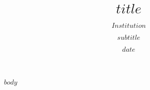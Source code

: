 \documentclass[xcolor=dvipsnames,a4paper,t]{beamer}
\title{$title$}
\subtitle{$Institution$}
\author{$subtitle$}
\institute{$Author$}
\date{$date$}
\begin{document}
\begin{frame}[plain]
  \titlepage
\end{frame}



\belowdisplayskip=0pt
\setlength{\abovedisplayskip}{0pt}
\setlength{\belowdisplayskip}{0pt}
\setlength{\abovedisplayshortskip}{0pt}
\setlength{\belowdisplayshortskip}{0pt}

$body$

\newpage

%


\end{document}
